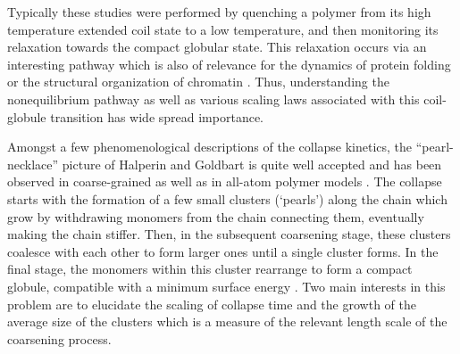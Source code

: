 \documentclass[aps,prx,reprint,showpacs,showkeys,noeprint,longbibliography]{revtex4-1} %
\begin{document}
Typically these studies were performed by quenching a polymer from its high temperature extended coil state to a low temperature, and then monitoring its relaxation towards the compact globular state. This relaxation occurs 
via  an interesting pathway which is also of relevance for the dynamics of protein folding \cite{camacho, reddy} or the structural organization of chromatin \cite{shi2018}. Thus, understanding the nonequilibrium pathway as well as various scaling laws associated with this coil-globule transition has wide spread importance.
\par 
Amongst a few phenomenological descriptions of the collapse kinetics, the
``pearl-necklace'' picture of Halperin and Goldbart \cite{halperin} is quite well accepted and has been observed in coarse-grained as well as in all-atom
polymer models \cite{majumder1,christiansen,byrne,guo,montesi,majumder2}. 
The collapse starts with the formation
of a few small clusters (‘pearls’) along the chain which grow by withdrawing
monomers from the chain connecting them, eventually making the chain
stiffer. Then, in the subsequent coarsening stage, these clusters coalesce with each
other to form larger ones until a single cluster forms. In the final stage,
the monomers within this cluster rearrange to form a compact globule,
compatible with a minimum surface energy \cite{schnabel}. Two main interests in this problem
are to elucidate the scaling of collapse time and the growth of the average size of the clusters which is a measure of the relevant length scale of the coarsening process.
 \par 
\end{document}
